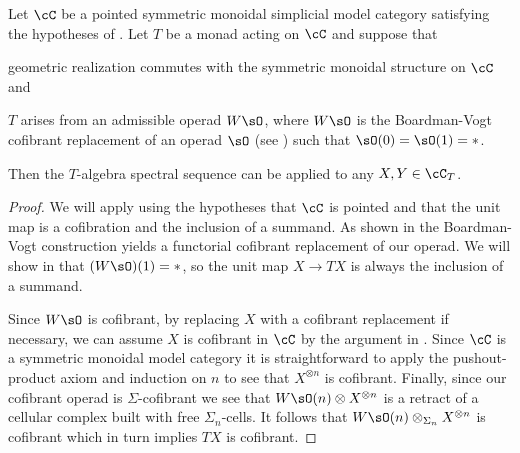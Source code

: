\documentclass[leqno,oneside,english]{elsarticle}
\begin{document}
\begin{prop}\label{prop:bv-operad}
  Let $\cC$ be a pointed symmetric monoidal simplicial model category
  satisfying the hypotheses of
  .
  Let $T$ be a monad acting on $\cC$ and suppose that
  \begin{hypothenumerate}
  \item\label{it:compat-with-realization} geometric realization commutes
  with the symmetric monoidal structure on $\cC$ and
  \item $T$ arises from an admissible operad $W\sO$, where $W\sO$ is
    the Boardman-Vogt cofibrant replacement of an
    operad $\sO$ (see \cite{BeM06}) such that $\sO(0)=\sO(1)=*$.
  \end{hypothenumerate}
  Then the $T$-algebra spectral sequence
  can be applied to any $X,Y\in \cC_T$.  
\end{prop}
\begin{proof}
  We will apply  using the hypotheses that
  $\cC$ is pointed and that the unit map is a cofibration and the inclusion of a
  summand. As shown in \cite{BeM06} the Boardman-Vogt construction
  yields a functorial cofibrant replacement of our operad. We will show in 
   that $(W\sO)(1)=*$, so the unit
  map $X\rightarrow TX$ is always the inclusion of a summand.
  
  Since $W\sO$ is cofibrant, by replacing $X$ with a cofibrant replacement
  if necessary, we can assume $X$ is cofibrant in $\cC$ by
  the argument in . Since $\cC$ is a symmetric monoidal
  model category it is straightforward to apply the pushout-product
  axiom and induction on $n$ to see that $X^{\otimes n}$ is cofibrant.
  Finally, since our cofibrant operad is $\Sigma$-cofibrant \cite[\S~2.4]{BeM06} 
  we see that $W\sO(n)\otimes X^{\otimes n}$ is a retract
  of a cellular complex built with free $\Sigma_n$-cells. It follows
  that $W\sO(n)\otimes_{\Sigma_n} X^{\otimes n}$ is cofibrant which in
  turn implies $TX$ is cofibrant.
\end{proof}
\end{document}
